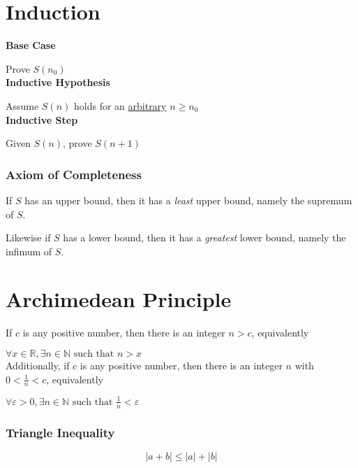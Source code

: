 \documentclass[12pt,letterpaper]{article}
\def\eps{\varepsilon{}}
\newcommand{\R}{{\mathbb R}}
\newcommand{\N}{{\mathbb N}}
\begin{document}
    \footnotesize
    \begin{multicols*}{2}
        \section{Induction}

        {\bf Base Case}

        Prove $S(n_0)$ \\

        {\bf Inductive Hypothesis}

        Assume $S(n)$ holds for an \underline{arbitrary} $n \geq n_0$ \\

        {\bf Inductive Step}

        Given $S(n)$, prove $S(n + 1)$

        \subsubsection{Axiom of Completeness}

        If $S$ has an upper bound, then it has a {\it least} upper bound, namely
        the supremum of $S$.

        Likewise if $S$ has a lower bound, then it has a {\it greatest} lower
        bound, namely the infimum of $S$.

        \section{Archimedean Principle}

        If $c$ is any positive number, then there is an integer $n > c$,
        equivalently

        $\forall x \in \R, \exists n \in \N \text{ such that } n > x$ \\

        Additionally, if $c$ is any positive number, then there is an integer
        $n$ with $0 < \frac{1}{n} < c$, equivalently

        $\forall \eps > 0, \exists n \in \N \text{ such that } \frac{1}{n} < \eps$ \\

        \subsubsection{Triangle Inequality}

        \[
            |a + b| \leq |a| + |b|
        \]


\end{multicols*}
\end{document}
